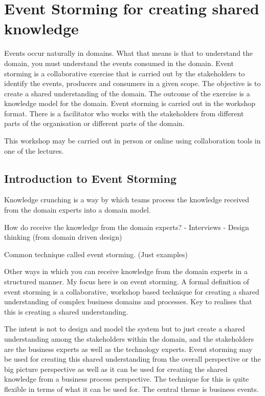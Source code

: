 \documentclass[a4paper, 11pt]{book}
\begin{document}
    \chapter{Event Storming for creating shared knowledge}

    Events occur naturally in domains.
    What that means is that to understand the domain, you must understand the events consumed in the domain.
    Event storming is a collaborative exercise that is carried out by the stakeholders to identify the events, producers and consumers in a given scope.
    The objective is to create a shared understanding of the domain.
    The outcome of the exercise is a knowledge model for the domain.
    Event storming is carried out in the workshop format.
    There is a facilitator who works with the stakeholders from different parts of the organisation or different parts of the domain.

    This workshop may be carried out in person or online using collaboration tools in one of the lectures.


    \section{Introduction to Event Storming}

    Knowledge crunching is a way by which teams process the knowledge received from the domain experts into a domain model.

    How do receive the knowledge from the domain experts?
    - Interviews
    - Design thinking (from domain driven design)

    Common technique called event storming. (Just examples)

    Other ways in which you can receive knowledge from the domain experts in a structured manner.
    My focus here is on event storming.
    A formal definition of event storming is a collaborative, workshop based technique for creating a shared understanding of complex business domains and processes.
    Key to realises that this is creating a shared understanding.

    The intent is not to design and model the system but to just create a shared understanding among the stakeholders within the domain, and the stakeholders are the business experts as well as the technology experts.
    Event storming may be used for creating this shared understanding from the overall perspective or the big picture perspective as well as it can be used for creating the shared knowledge from a business process perspective.
    The technique for this is quite flexible in terms of what it can be used for.
    The central theme is business events.
\end{document}
